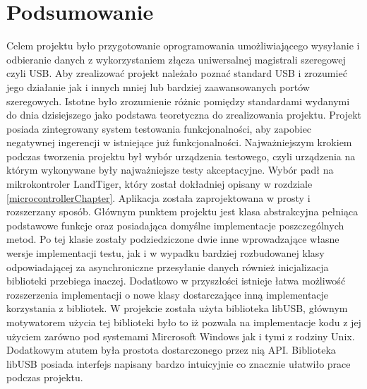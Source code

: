 \documentclass{BscUS}
\begin{document}
\chapter{Podsumowanie}
\label{ConclusionChapter}
\indent Celem projektu było przygotowanie oprogramowania umożliwiającego wysyłanie i odbieranie danych z wykorzystaniem złącza uniwersalnej magistrali szeregowej czyli USB. Aby zrealizować projekt należało poznać standard USB i zrozumieć jego działanie jak i innych mniej lub bardziej zaawansowanych portów szeregowych. Istotne było zrozumienie różnic pomiędzy standardami wydanymi do dnia dzisiejszego jako podstawa teoretyczna do zrealizowania projektu. Projekt posiada zintegrowany system testowania funkcjonalności, aby zapobiec negatywnej ingerencji w istniejące już funkcjonalności.
\newline
\indent Najważniejszym krokiem podczas tworzenia projektu był wybór urządzenia testowego, czyli urządzenia na którym wykonywane były najważniejsze testy akceptacyjne. Wybór padł na mikrokontroler LandTiger, który został dokładniej opisany w rozdziale \ref{microcontrollerChapter}. Aplikacja została zaprojektowana w prosty i rozszerzany sposób. Głównym punktem projektu jest klasa abstrakcyjna pełniąca podstawowe funkcje oraz posiadająca domyślne implementacje poszczególnych metod. Po tej klasie zostały podziedziczone dwie inne wprowadzające własne wersje implementacji testu, jak i w wypadku bardziej rozbudowanej klasy odpowiadającej za asynchroniczne przesyłanie danych również inicjalizacja biblioteki przebiega inaczej. Dodatkowo w przyszłości istnieje łatwa możliwość rozszerzenia implementacji o nowe klasy dostarczające inną implementacje korzystania z bibliotek.
\newline
\indent W projekcie została użyta biblioteka libUSB, głównym motywatorem użycia tej biblioteki było to iż pozwala na implementacje kodu z jej użyciem zarówno pod systemami Mircrosoft Windows jak i tymi z rodziny Unix. Dodatkowym atutem była prostota dostarczonego przez nią API. Biblioteka libUSB posiada interfejs napisany bardzo intuicyjnie co znacznie ułatwiło prace podczas projektu.
\newline
\end{document}
